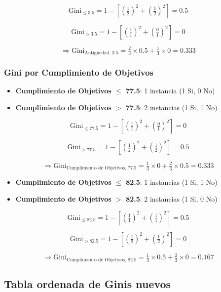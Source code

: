 \documentclass[12pt]{article}
\begin{document}
\[
  \mathrm{Gini}_{\le3.5} = 1 - \left[\left(\tfrac{1}{2}\right)^2 + \left(\tfrac{1}{2}\right)^2\right] = 0.5
\]

\[
  \mathrm{Gini}_{>3.5} = 1 - \left[\left(\tfrac{1}{1}\right)^2 + \left(\tfrac{0}{1}\right)^2\right] = 0
\]

\[
  \Rightarrow \mathrm{Gini}_{\text{Antigüedad, 3.5}} = \tfrac{2}{3}\times0.5 + \tfrac{1}{3}\times0 = 0.333
\]

\subsubsection{Gini por Cumplimiento de Objetivos}

\begin{itemize}
  \item \textbf{Cumplimiento de Objetivos $\leq$ 77.5}: 1 instancia (1 Si, 0 No)
  \item \textbf{Cumplimiento de Objetivos $>$ 77.5}: 2 instancias (1 Si, 1 No)
\end{itemize}

\[
  \mathrm{Gini}_{\le77.5} = 1 - \left[\left(\tfrac{1}{1}\right)^2 + \left(\tfrac{0}{1}\right)^2\right] = 0
\]

\[
  \mathrm{Gini}_{>77.5} = 1 - \left[\left(\tfrac{1}{2}\right)^2 + \left(\tfrac{1}{2}\right)^2\right] = 0.5
\]

\[
  \Rightarrow \mathrm{Gini}_{\text{Cumplimiento de Objetivos, 77.5}} = \tfrac{1}{3}\times0 + \tfrac{2}{3}\times0.5 = 0.333
\]


\begin{itemize}
  \item \textbf{Cumplimiento de Objetivos $\leq$ 82.5}: 1 instancias (1 Si, 1 No)
  \item \textbf{Cumplimiento de Objetivos $>$ 82.5}: 2 instancias (1 Si, 0 No)
\end{itemize}

\[
  \mathrm{Gini}_{\le82.5} = 1 - \left[\left(\tfrac{1}{1}\right)^2 + \left(\tfrac{1}{1}\right)^2\right] = 0.5
\]

\[
  \mathrm{Gini}_{>82.5} = 1 - \left[\left(\tfrac{1}{2}\right)^2 + \left(\tfrac{1}{2}\right)^2\right] = 0
\]

\[
  \Rightarrow \mathrm{Gini}_{\text{Cumplimiento de Objetivos, 82.5}} = \tfrac{1}{3}\times0.5 + \tfrac{2}{3}\times0 = 0.167
\]

\subsection{Tabla ordenada de Ginis nuevos}
\end{document}
